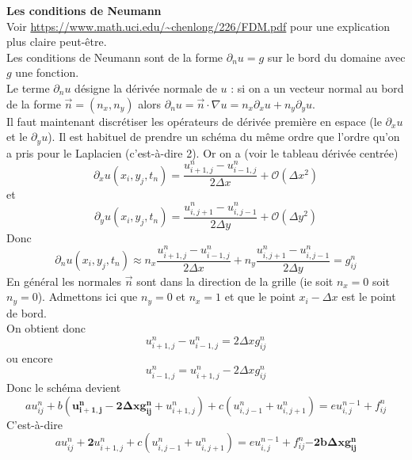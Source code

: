 \documentclass[11pt,a4paper]{article}
\newcommand{\dx}{\Delta x}
\newcommand{\dy}{\Delta y}
\begin{document}
\noindent\textbf{Les conditions de Neumann}\\
Voir \url{https://www.math.uci.edu/~chenlong/226/FDM.pdf} pour une explication plus claire peut-être.\\
Les conditions de Neumann sont de la forme $\partial_n u = g$ sur le bord du domaine avec $g$ une fonction.\\
Le terme $\partial_n u$ désigne la dérivée normale de $u$ : si on a un vecteur normal au bord de la forme $\vec{n} = (n_x, n_y)$ alors $\partial_n u = \vec{n} \cdot \nabla u = n_x \partial_x u + n_y \partial_y u$.\\
Il faut maintenant discrétiser les opérateurs de dérivée première en espace (le $\partial_xu$ et le $\partial_y u$). Il est habituel de prendre un schéma du même ordre que l'ordre qu'on a pris pour le Laplacien (c'est-à-dire 2). Or on a (voir le tableau dérivée centrée)
\begin{equation}
    \partial_x u(x_i, y_j, t_n) = \frac{u_{i+1, j}^n - u_{i-1, j}^n}{2\dx} + \mathcal{O}(\dx^2)
\end{equation} 
et
\begin{equation}
    \partial_y u(x_i, y_j, t_n) = \frac{u_{i, j+1}^n - u_{i, j-1}^n}{2\dy} + \mathcal{O}(\dy^2)
\end{equation} 
Donc 
\begin{equation}
    \partial_n u(x_i, y_j, t_n) \approx n_x \frac{u_{i+1, j}^n - u_{i-1, j}^n}{2\dx} + n_y \frac{u_{i, j+1}^n - u_{i, j-1}^n}{2\dy} = g_{ij}^n
\end{equation}
En général les normales $\vec{n}$ sont dans la direction de la grille (ie soit $n_x=0$ soit $n_y = 0$). Admettons ici que $n_y = 0$ et $n_x=1$ et que le point $x_i - \dx$ est le point de bord.\\
On obtient donc
\begin{equation}
    u_{i+1, j}^n - u_{i-1, j}^n = 2\dx g_{ij}^n
\end{equation}
ou encore
\begin{equation}
    u_{i-1, j}^n = u_{i+1, j}^n - 2\dx g_{ij}^n
\end{equation}
Donc le schéma devient
\begin{equation}
    au_{ij}^n + b\left(\boldsymbol{u_{i+1, j}^n - 2\dx g_{ij}^n} + u_{i+1, j}^n\right) +  c\left(u_{i, j-1}^n + u_{i, j+1}^n\right) = e u_{i, j}^{n-1} + f_{ij}^n
\end{equation}
C'est-à-dire
\begin{equation}
    au_{ij}^n + \boldsymbol{2} u_{i+1, j}^n +  c\left(u_{i, j-1}^n + u_{i, j+1}^n\right) = e u_{i, j}^{n-1} + f_{ij}^n \boldsymbol{- 2b\dx g_{ij}^n}
\end{equation}
\end{document}
